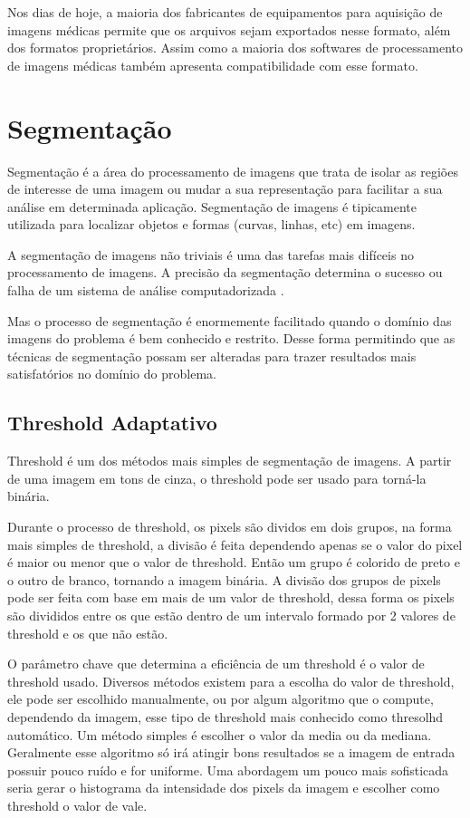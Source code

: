 Nos dias de hoje, a maioria dos fabricantes de equipamentos para aquisição de imagens médicas permite que os arquivos sejam exportados nesse formato, além dos formatos proprietários. Assim como a maioria dos softwares de processamento de imagens médicas também apresenta compatibilidade com esse formato.

\section{Segmentação}

Segmentação é a área do processamento de imagens que trata de isolar as regiões de interesse de uma imagem ou mudar a sua representação para facilitar a sua análise em determinada aplicação. Segmentação de imagens é tipicamente utilizada para localizar objetos e formas (curvas, linhas, etc) em imagens.

A segmentação de imagens não triviais é uma das tarefas mais difíceis no processamento de imagens. A precisão da segmentação determina o sucesso ou falha de um sistema de análise computadorizada \cite{gonzalez}.

Mas o processo de segmentação é enormemente facilitado quando o domínio das imagens do problema é bem conhecido e restrito. Desse forma permitindo que as técnicas de segmentação possam ser alteradas para trazer resultados mais satisfatórios no domínio do problema.

\subsection{Threshold Adaptativo}
\label{subsec:threshold}

Threshold é um dos métodos mais simples de segmentação de imagens. A partir de uma imagem em tons de cinza, o threshold pode ser usado para torná-la binária.

Durante o processo de threshold, os pixels são dividos em dois grupos, na forma mais simples de threshold, a divisão é feita dependendo apenas se o valor do pixel é maior ou menor que o valor de threshold. Então um grupo é colorido de preto e o outro de branco, tornando a imagem binária. A divisão dos grupos de pixels pode ser feita com base em mais de um valor de threshold, dessa forma os pixels são divididos entre os que estão dentro de um intervalo formado por 2 valores de threshold e os que não estão.

O parâmetro chave que determina a eficiência de um threshold é o valor de threshold usado. Diversos métodos existem para a escolha do valor de threshold, ele pode ser escolhido manualmente, ou por algum algoritmo que o compute, dependendo da imagem, esse tipo de threshold mais conhecido como thresolhd automático. Um método simples é escolher o valor da media ou da mediana. Geralmente esse algoritmo só irá atingir bons resultados se a imagem de entrada possuir pouco ruído e for uniforme. Uma abordagem um pouco mais sofisticada seria gerar o histograma da intensidade dos pixels da imagem e escolher como threshold o valor de vale.

